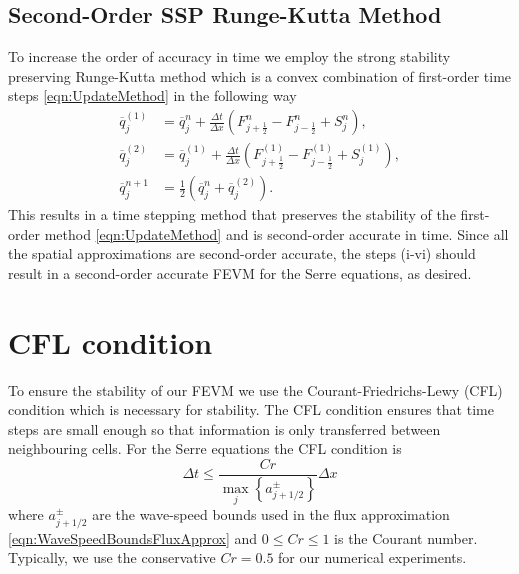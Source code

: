 \subsection{Second-Order SSP Runge-Kutta Method}
To increase the order of accuracy in time we employ the strong stability preserving Runge-Kutta method \cite{Gottlieb-etal-2003-89} which is a convex combination of first-order time steps \eqref{eqn:UpdateMethod} in the following way
\begin{subequations}
\begin{align}
\overline{q}_j^{(1)} &= \overline{q}^{n}_j + \frac{\Delta t}{\Delta x} \left(F^n_{j+\frac{1}{2}} - F^n_{j-\frac{1}{2}} + S^n_j\right),\\
\overline{q}_j^{(2)} &= \overline{q}_j^{(1)} + \frac{\Delta t}{\Delta x} \left(F_{j+\frac{1}{2}}^{(1)} - F_{j-\frac{1}{2}}^{(1)}  + S_j^{(1)} \right), \\
\overline{q}^{n+1}_j &= \frac{1}{2} \left( \overline{q}^n_j +  \overline{q}_j^{(2)}  \right).
\end{align}
\label{eqn:SSPRKStep1}
\end{subequations}
This results in a time stepping method that preserves the stability of the first-order method \eqref{eqn:UpdateMethod} and is second-order accurate in time. Since all the spatial approximations are second-order accurate, the steps (i-vi) should result in a second-order accurate FEVM for the Serre equations, as desired. 

\setcounter{subsection}{0}
\renewcommand{\thesubsection}{\thechapter.\arabic{section}.\arabic{subsection}} 

\section{CFL condition}
To ensure the stability of our FEVM we use the Courant-Friedrichs-Lewy (CFL) condition \cite{Courant-etal-1967-215} which is necessary for stability. The CFL condition ensures that time steps are small enough so that information is only transferred between neighbouring cells. For the Serre equations the CFL condition is 
\begin{equation}
\Delta t \le \frac{Cr }{\max_{j} \left\lbrace a^\pm_{j+1/2} \right\rbrace} \Delta x
\label{eqn:CFLcond}
\end{equation}
where $a^\pm_{j+1/2} $ are the wave-speed bounds used in the flux approximation \eqref{eqn:WaveSpeedBoundsFluxApprox} and $0\le Cr \le 1$ is the Courant number. Typically, we use the conservative $Cr = 0.5$ for our numerical experiments. 

